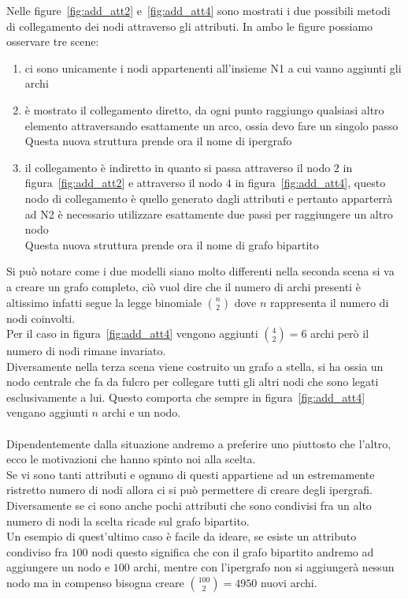 %
Nelle figure~\ref{fig:add_att2} e~\ref{fig:add_att4} sono mostrati i due possibili metodi di collegamento dei nodi attraverso gli attributi. In ambo le figure possiamo osservare tre scene:
\begin{enumerate}
	\item ci sono unicamente i nodi appartenenti all'insieme N1 a cui vanno aggiunti gli archi
	\item è mostrato il collegamento diretto, da ogni punto raggiungo qualsiasi altro elemento attraversando esattamente un arco, ossia devo fare un singolo passo\\
	Questa nuova struttura prende ora il nome di ipergrafo
	\item il collegamento è indiretto in quanto si passa attraverso il nodo $2$ in figura~\ref{fig:add_att2} e attraverso il nodo $4$ in figura~\ref{fig:add_att4}, questo nodo di collegamento è quello generato dagli attributi e pertanto apparterrà ad N2
	è necessario utilizzare esattamente due passi per raggiungere un altro nodo\\
	Questa nuova struttura prende ora il nome di grafo bipartito
\end{enumerate}
%
Si può notare come i due modelli siano molto differenti nella seconda scena si va a creare un grafo completo, ciò vuol dire che il numero di archi presenti è altissimo infatti segue la legge binomiale $ \displaystyle\binom{n}{2}$ dove $n$ rappresenta il numero di nodi coinvolti.\\
Per il caso in figura~\ref{fig:add_att4} vengono aggiunti $ \displaystyle\binom{4}{2} = 6$ archi però il numero di nodi rimane invariato.\\
Diversamente nella terza scena viene costruito un grafo a stella, si ha ossia un nodo centrale che fa da fulcro per collegare tutti gli altri nodi che sono legati esclusivamente a lui. Questo comporta che sempre in figura~\ref{fig:add_att4} vengano aggiunti $n$ archi e un nodo.\\
\\
Dipendentemente dalla situazione andremo a preferire uno piuttosto che l'altro, ecco le motivazioni che hanno spinto noi alla scelta.\\
Se vi sono tanti attributi e ognuno di questi appartiene ad un estremamente ristretto numero di nodi allora ci si può permettere di creare degli ipergrafi. Diversamente se ci sono anche pochi attributi che sono condivisi fra un alto numero di nodi la scelta ricade sul grafo bipartito.\\
Un esempio di quest'ultimo caso è facile da ideare, se esiste un attributo condiviso fra $100$ nodi questo significa che con il grafo bipartito andremo ad aggiungere un nodo e $100$ archi, mentre con l'ipergrafo non si aggiungerà nessun nodo ma in compenso bisogna creare $ \displaystyle\binom{100}{2} = 4950$ nuovi archi.\\
